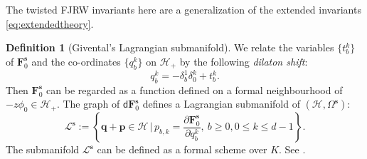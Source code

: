 \documentclass[11pt]{amsart}
\theoremstyle{definition} %
\newtheorem{defn}[thm]{Definition} %
\theoremstyle{remark} %
\def\parfrac#1#2{\frac{\partial #1}{\partial #2}}
\newcommand{\bs}{\mathbf{s}}
\newcommand{\bp}{\mathbf{p}}
\newcommand{\bq}{\mathbf{q}}
\newcommand{\bF}{\mathbf{F}}
\newcommand{\cL}{\mathcal{L}}
\newcommand{\cH}{\mathcal{H}}
\newcommand{\dd}{\mathsf{d}}
\begin{document}
The twisted FJRW invariants here 
are a generalization of the extended 
invariants \eqref{eq:extendedtheory}. 


\begin{defn}[Givental's Lagrangian submanifold] 
We relate the variables $\{t_b^k\}$ of $\bF^\bs_0$ 
and the co-ordinates $\{q_b^k\}$ on $\cH_+$ 
by the following \emph{dilaton shift}: 
\[
q_b^k = - \delta_b^1 \delta^k_0 + t_b^k. 
\]
Then $\bF_0^\bs$ can be regarded as a function defined on 
a formal neighbourhood of $-z \phi_0 \in \cH_+$. 
The graph of $\dd\bF_0^{\bs}$ defines a Lagrangian 
submanifold of $(\cH,\Omega^\bs)$: 
\begin{equation} 
\label{eq:Lag-cone}
\cL^{\bs}:=\left\{ \bq +\bp \in \cH \,\Big |\, 
p_{b,k} = \parfrac{\bF_0^{\bs}}{q_b^k}, \ b\ge 0, 0\le k\le d-1 
\right \}.
\end{equation} 
The submanifold $\cL^\bs$ 
can be defined as a formal scheme over $K$. 
See \cite[Appendix B]{CCIT:computing}.  
\end{defn} 

\end{document}
